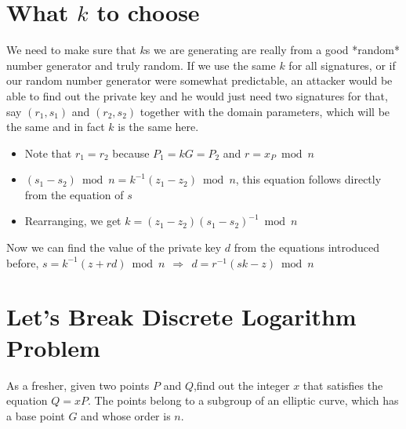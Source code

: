 \documentclass[12pt,letterpaper]{article}
\begin{document}
\section{What $k$ to choose}
We need to make sure that $k$s we are generating are really from a good *random* number generator and truly random.
If we use the same $k$ for all signatures, or if our random number generator were somewhat predictable, an attacker would be able to find out the private key and he would just need two signatures for that, say $(r_1,s_1)$ and $(r_2,s_2)$
together with the domain parameters, which will be the same and in fact $k$ is the same here. 
\begin{itemize}
    \item Note that $r_1 = r_2$ because $P_1=kG=P_2$ and $r = x_P \bmod{n}$ 
    \item $(s_1 - s_2) \bmod{n} = k^{-1} (z_1 - z_2) \bmod{n}$, this equation follows directly from the equation of $s$
    \item Rearranging, we get $k = (z_1 - z_2)(s_1 - s_2)^{-1} \bmod{n}$
\end{itemize}
Now we can find the value of the private key $d$ from the equations introduced before, $s = k^{-1}(z + rd) \bmod{n}\ \ \Rightarrow\ \ d = r^{-1} (sk - z) \bmod{n}$ 
\section{Let's Break Discrete Logarithm Problem}
As a fresher, given two points $P$ and $Q$,find out the integer $x$ that satisfies the equation $Q=xP$. The points belong to a subgroup of an elliptic curve, which has a base point $G$ and whose order is $n$.
\end{document}
